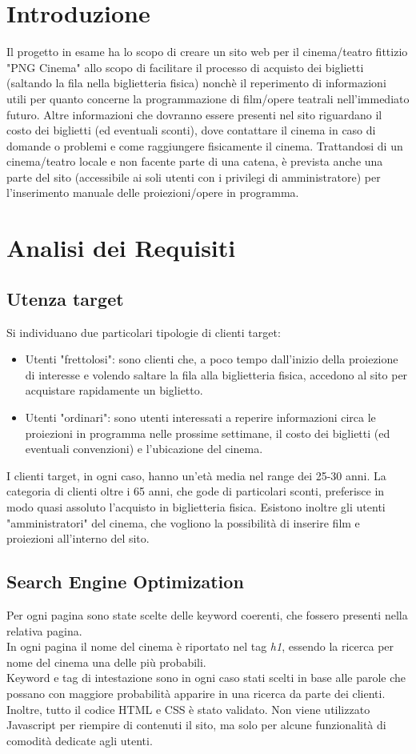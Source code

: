 \documentclass[a4paper, 12pt]{article}
\begin{document}
\makefrontpage

\section{Introduzione}
Il progetto in esame ha lo scopo di creare un sito web per il cinema/teatro fittizio "PNG Cinema" allo scopo di facilitare il processo di acquisto dei biglietti (saltando la fila nella biglietteria fisica) nonchè
il reperimento di informazioni utili per quanto concerne la programmazione di film/opere teatrali nell'immediato futuro.
Altre informazioni che dovranno essere presenti nel sito riguardano il costo dei biglietti (ed eventuali sconti), dove contattare il cinema in caso di domande o problemi e come raggiungere fisicamente il cinema.
Trattandosi di un cinema/teatro locale e non facente parte di una catena, è prevista anche una parte del sito (accessibile ai soli utenti con i privilegi di amministratore) per l'inserimento manuale delle proiezioni/opere in programma.

\section{Analisi dei Requisiti}
\subsection{Utenza target}
Si individuano due particolari tipologie di clienti target:
\begin{itemize}
    \item Utenti "frettolosi": sono clienti che, a poco tempo dall'inizio della proiezione di interesse e volendo saltare la fila alla biglietteria fisica, accedono al sito per acquistare rapidamente un biglietto.
    \\\item Utenti "ordinari": sono utenti interessati a reperire informazioni circa le proiezioni in programma nelle prossime settimane, il costo dei biglietti (ed eventuali convenzioni) e l'ubicazione del cinema.
\end{itemize}
I clienti target, in ogni caso, hanno un'età media nel range dei 25-30 anni. La categoria di clienti oltre i 65 anni, che gode di particolari sconti, preferisce in modo quasi assoluto l'acquisto in biglietteria fisica.
Esistono inoltre gli utenti "amministratori" del cinema, che vogliono la possibilità di inserire film e proiezioni all'interno del sito.
\subsection{Search Engine Optimization}
Per ogni pagina sono state scelte delle keyword coerenti, che fossero presenti nella relativa pagina.\\
In ogni pagina il nome del cinema è riportato nel tag \textit{h1}, essendo la ricerca per nome del cinema una delle più probabili.\\
Keyword e tag di intestazione sono in ogni caso stati scelti in base alle parole che possano con maggiore probabilità apparire in una ricerca da parte dei clienti.
Inoltre, tutto il codice HTML e CSS è stato validato.
Non viene utilizzato Javascript per riempire di contenuti il sito, ma solo per alcune funzionalità di comodità dedicate agli utenti.
\newpage
\end{document}
